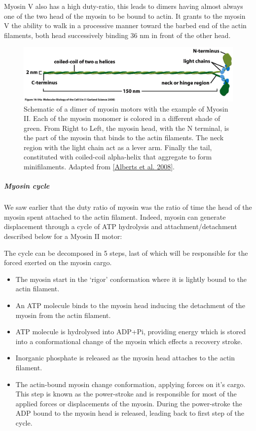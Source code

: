 \documentclass[A4paperpaper,11pt,english]{sphinxmanual}
\begin{document}
Myosin V also has a high duty-ratio, this leads to dimers having almost always
one of the two head of the myosin to be bound to actin. It grants to the myosin
V the ability to walk in a processive manner toward the barbed end of
the actin filaments, both head successively binding 36 nm in front of the other
head.
\begin{figure}[htbp]
\centering
\capstart

\includegraphics[width=0.700\linewidth]{figure-16-54a.jpg}
\caption{Schematic of a dimer of myosin motors with the example of Myosin II.
Each of the myosin monomer is colored in a
different shade of green. From Right to Left, the myosin head, with the N
terminal, is the part of the myosin that binds to the actin filaments. The
neck region with the light chain act as a lever arm. Finally the tail,
constituted with coiled-coil alpha-helix that aggregate to form minifilaments.
Adapted from {\hyperref[index-latex:alberts2008]{{[}Alberts et al. 2008{]}}}.}\label{index-latex:fig-myosin}\end{figure}


\subparagraph{Myosin cycle}
\label{index-latex:myosin-cycle}
We saw earlier that the duty ratio of myosin was the ratio of time the head of
the myosin spent attached to the actin filament. Indeed, myosin can generate
displacement through a cycle of ATP hydrolysis and attachment/detachment
described below for a Myosin II motor:

The cycle can be decomposed in 5 steps, last of which will be responsible for
the forced exerted on the myosin cargo.
\begin{itemize}
\item {} 
The myosin start in the `rigor' conformation where it is lightly bound to
the actin filament.

\item {} 
An ATP molecule binds to the myosin head inducing the detachment of the
myosin from the actin filament.

\item {} 
ATP molecule is hydrolysed into ADP+Pi, providing energy which is stored
into a conformational change of the myosin which effects a recovery
stroke.

\item {} 
Inorganic phosphate is released as the myosin head attaches to the actin
filament.

\item {} 
The actin-bound myosin change conformation, applying forces on it's
cargo. This step is known as the power-stroke and is responsible for most
of the applied forces or displacements of the myosin. During the
power-stroke the ADP bound to the myosin head is released, leading back
to first step of the cycle.

\end{itemize}
\end{document}
